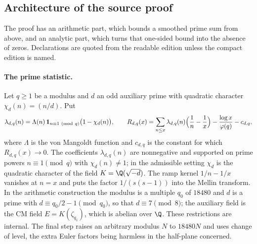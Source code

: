 \subsection{Architecture of the source proof}\label{src:sec:mechanism}
\begingroup\raggedright
{}
\endgroup

The proof has an arithmetic part, which bounds a smoothed prime sum from above, and an
analytic part, which turns that one-sided bound into the absence of zeros. Declarations are
quoted from the readable edition unless the compact edition is named.

\paragraph{The prime statistic.}
Let $q\ge1$ be a modulus and $d$ an odd auxiliary prime with quadratic character
$\chi_d(n)=(n/d)$. Put
\begin{equation}\label{src:eq:R}
\lambda_{d,q}(n)=\Lambda(n)\,\mathbf 1_{n\equiv1\ (\mathrm{mod}\ q)}\bigl(1-\chi_d(n)\bigr),\qquad
R_{d,q}(x)=\sum_{n\le x}\lambda_{d,q}(n)\Bigl(\frac1n-\frac1x\Bigr)-\frac{\log x}{\varphi(q)}-c_{d,q},
\end{equation}
where $\Lambda$ is the von Mangoldt function and $c_{d,q}$ is the constant for which
$R_{d,q}(x)\to0$. The coefficients $\lambda_{d,q}(n)$ are nonnegative and supported on prime
powers $n\equiv1\pmod q$ with $\chi_d(n)\ne1$; in the admissible setting $\chi_d$ is the
quadratic character of the field $K=\Q(\sqrt{-d})$. The ramp kernel
$1/n-1/x$ vanishes at $n=x$ and puts the factor $1/(s(s-1))$ into the Mellin transform. In
the arithmetic construction the modulus is a multiple $q_0$ of $18480$ and $d$ is a prime
with $d\equiv q_0/2-1\pmod{q_0}$, so that $d\equiv7\pmod 8$; the auxiliary field is the CM
field $E=K(\zeta_{q_1})$, which is abelian over $\Q$. These restrictions are internal. The
final step raises an arbitrary modulus $N$ to $18480N$ and uses change of level, the extra
Euler factors being harmless in the half-plane concerned.

